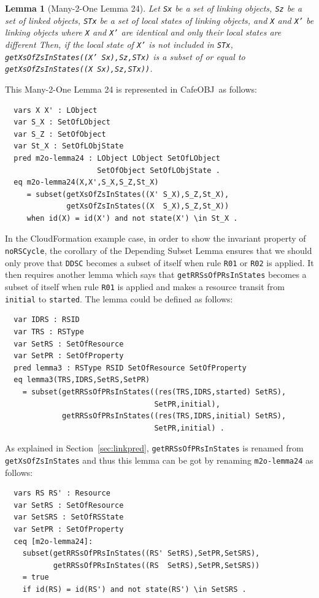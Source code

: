 \documentclass[12pt]{report}
\newtheorem{lemma}{Lemma}
\newcommand{\stt}[1]{{\small{\tt {#1}}}}
\newcommand{\cafeobj}{{\sf CafeOBJ}~}
\begin{document}
\begin{lemma}[Many-2-One Lemma 24]
  Let {\tt Sx} be a set of linking objects, {\tt Sz} be a set of
  linked objects, {\tt STx} be a set of local states of linking
  objects, and {\tt X} and {\tt X'} be linking objects where {\tt X}
  and {\tt X'} are identical and only their local states are different
  Then, if the local state of {\tt X'} is not included in {\tt STx},
  \stt{getXsOfZsInStates((X' Sx),Sz,STx)} is a subset of or equal to
  \stt{getXsOfZsInStates((X Sx),Sz,STx))}.
\end{lemma}
This Many-2-One Lemma 24 is represented in \cafeobj as follows:
\small
\begin{verbatim}
  vars X X' : LObject
  var S_X : SetOfLObject
  var S_Z : SetOfObject
  var St_X : SetOfLObjState
  pred m2o-lemma24 : LObject LObject SetOfLObject
                     SetOfObject SetOfLObjState .
  eq m2o-lemma24(X,X',S_X,S_Z,St_X)
     = subset(getXsOfZsInStates((X' S_X),S_Z,St_X),
              getXsOfZsInStates((X  S_X),S_Z,St_X))
     when id(X) = id(X') and not state(X') \in St_X .
\end{verbatim}
\normalsize
In the CloudFormation example case, in order to show the invariant
property of {\tt noRSCycle}, the corollary of the Depending Subset
Lemma ensures that we should only prove that {\tt DDSC} becomes a
subset of itself when rule {\tt R01} or {\tt R02} is applied. It then
requires another lemma which says that {\tt getRRSsOfPRsInStates}
becomes a subset of itself when rule {\tt R01} is applied and makes a
resource transit from {\tt initial} to {\tt started}.  The lemma could
be defined as follows:
\small
\begin{verbatim}
  var IDRS : RSID 
  var TRS : RSType
  var SetRS : SetOfResource
  var SetPR : SetOfProperty
  pred lemma3 : RSType RSID SetOfResource SetOfProperty
  eq lemma3(TRS,IDRS,SetRS,SetPR)
    = subset(getRRSsOfPRsInStates((res(TRS,IDRS,started) SetRS),
                                  SetPR,initial), 
             getRRSsOfPRsInStates((res(TRS,IDRS,initial) SetRS),
                                  SetPR,initial) .
\end{verbatim}
\normalsize
As explained in Section~\ref{sec:linkpred}, {\tt getRRSsOfPRsInStates}
is renamed from {\tt getXsOfZsInStates} and thus this lemma can be got
by renaming {\tt m2o-lemma24} as follows:
\small
\begin{verbatim}
  vars RS RS' : Resource
  var SetRS : SetOfResource
  var SetSRS : SetOfRSState
  var SetPR : SetOfProperty
  ceq [m2o-lemma24]:
    subset(getRRSsOfPRsInStates((RS' SetRS),SetPR,SetSRS),
           getRRSsOfPRsInStates((RS  SetRS),SetPR,SetSRS))
    = true
    if id(RS) = id(RS') and not state(RS') \in SetSRS .
\end{verbatim}
\normalsize
\end{document}

